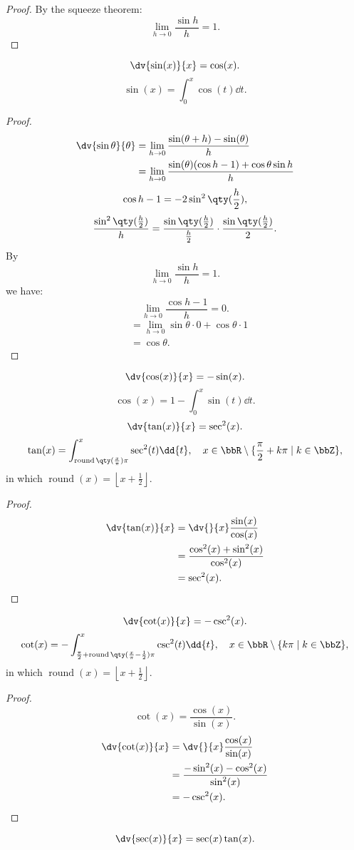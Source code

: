 \documentclass[a4paper,12pt]{report}
\begin{document}
\begin{itemize}
\begin{itemize}
\begin{proof}
By the squeeze theorem:
\[\lim_{h\to 0}\frac{\sin h}{h}=1.\]
\end{proof}
\[\dv{\sin(x)}{x}=\cos(x).\]
\[\sin(x)=\int_0^x\cos(t)\dd{t}.\]
\begin{proof}
\[\begin{aligned}
\dv{\sin\theta}{\theta}&=\lim_{h\to 0}\frac{\sin(\theta+h)-\sin(\theta)}{h}\\
&=\lim_{h\to 0}\frac{\sin(\theta)(\cos h-1)+\cos\theta\sin h}{h}
\end{aligned}\]
\[\cos h-1=-2\sin^2\qty(\frac{h}{2}),\]
\[\frac{\sin^2\qty(\frac{h}{2})}{h}=\frac{\sin\qty(\frac{h}{2})}{\frac{h}{2}}\cdot\frac{\sin\qty(\frac{h}{2})}{2}.\]
By
\[\lim_{h\to 0}\frac{\sin h}{h}=1.\]
we have:
\[\lim_{h\to 0}\frac{\cos h-1}{h}=0.\]
\[\begin{aligned}
&=\lim_{h\to 0}\sin\theta\cdot 0+\cos\theta\cdot 1\\
&=\cos\theta.
\end{aligned}\]
\end{proof}
\[\dv{\cos(x)}{x}=-\sin(x).\]
\[\cos(x)=1-\int_0^x\sin(t)\dd{t}.\]
\[\dv{\tan(x)}{x}=\sec^2(x).\]
\[\tan(x)=\int_{\operatorname{round}\qty(\frac{x}{\pi})\pi}^x\sec^2(t)\dd{t},\quad x\in\bbR\setminus\{\frac{\pi}{2}+k\pi\mid k\in\bbZ\},\]
in which $\operatorname{round}(x)=\left\lfloor x+\frac{1}{2}\right\rfloor$.
\begin{proof}
\[\begin{aligned}
\dv{\tan(x)}{x}&=\dv{}{x}\frac{\sin(x)}{\cos(x)}\\
&=\frac{\cos^2(x)+\sin^2(x)}{\cos^2(x)}\\
&=\sec^2(x).
\end{aligned}\]
\end{proof}
\[\dv{\cot(x)}{x}=-\csc^2(x).\]
\[\cot(x)=-\int_{\frac{\pi}{2}+\operatorname{round}\qty(\frac{x}{\pi}-\frac{1}{2})\pi}^x\csc^2(t)\dd{t},\quad x\in\bbR\setminus\{k\pi\mid k\in\bbZ\},\]
in which $\operatorname{round}(x)=\left\lfloor x+\frac{1}{2}\right\rfloor$.
\begin{proof}
\[\cot(x)=\frac{\cos(x)}{\sin(x)}.\]
\[\begin{aligned}
\dv{\cot(x)}{x}&=\dv{}{x}\frac{\cos(x)}{\sin(x)}\\
&=\frac{-\sin^2(x)-\cos^2(x)}{\sin^2(x)}\\
&=-\csc^2(x).
\end{aligned}\]
\end{proof}
\[\dv{\sec(x)}{x}=\sec(x)\tan(x).\]

\end{itemize}
\end{itemize}
\end{document}

